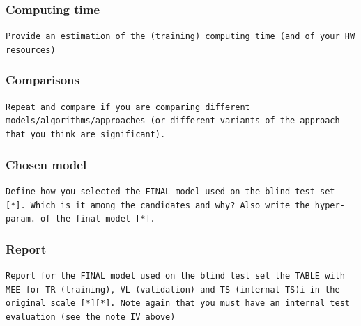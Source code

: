 \subsubsection{Computing time}
\texttt{Provide an estimation of the (training) computing time (and of your HW resources)}
\subsubsection{Comparisons}
\texttt{Repeat and compare if you are comparing different models/algorithms/approaches (or different variants of the approach that you think are significant). }
\subsubsection{Chosen model}
\texttt{Define how you selected the FINAL model used on the blind test set [*]. Which is it among the candidates and why? Also write the  hyper-param. of the final model [*].}
\subsubsection{Report}
\texttt{Report for the FINAL model used on the blind test set the TABLE with MEE for TR (training), VL (validation) and TS (internal TS)i  in the original scale [*][*]. Note again  that you must have an internal  test evaluation (see the note IV above)}
